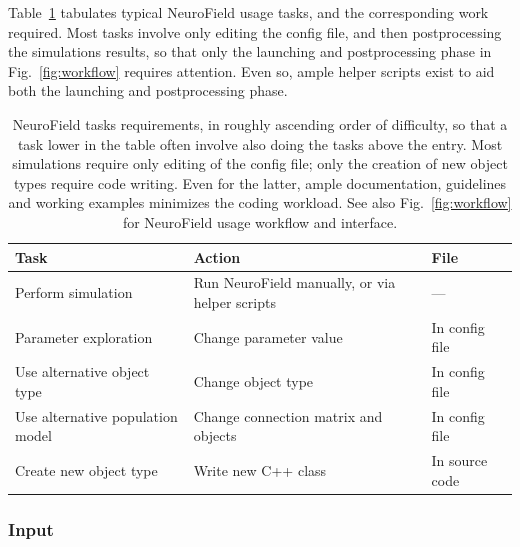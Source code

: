 \documentclass[preprint,review,10pt,authoryear,letterpaper]{elsarticle}
\begin{document}
Table~\ref{tab:task} tabulates typical NeuroField usage tasks, and the corresponding work required. Most tasks involve only editing the config file, and then postprocessing the simulations results, so that only the launching and postprocessing phase in Fig.~\ref{fig:workflow} requires attention. Even so, ample helper scripts exist to aid both the launching and postprocessing phase.

\begin{table}
	\begin{tabular}{ p{4.2cm} p{4.5cm} l }
	\hline
	Task & Action & File \\
	\hline
	Perform simulation & Run NeuroField manually, or via helper scripts & --- \\
	Parameter exploration & Change parameter value & In config file \\
	Use alternative object type & Change object type & In config file \\
	Use alternative population model & Change connection matrix and objects & In config file \\
	Create new object type & Write new C++ class & In source code \\
	\hline
\end{tabular}
\caption{NeuroField tasks requirements, in roughly ascending order of difficulty, so that a task lower in the table often involve also doing the tasks above the entry. Most simulations require only editing of the config file; only the creation of new object types require code writing. Even for the latter, ample documentation, guidelines and working examples minimizes the coding workload. See also Fig.~\ref{fig:workflow} for NeuroField usage workflow and interface.}
\label{tab:task}
\end{table}

\subsubsection{Input}
\end{document}

